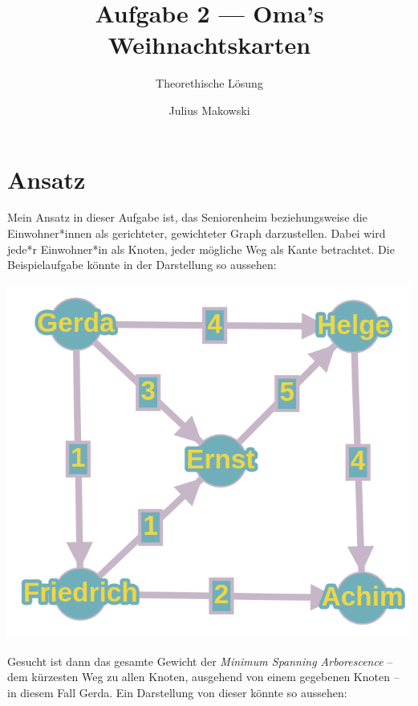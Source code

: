 \documentclass[12pt]{scrartcl}
\title{Aufgabe 2 --- Oma's Weihnachtskarten}
\subtitle{Theorethische L\"osung}
\author{Julius Makowski}
\date{}
\begin{document}
  \maketitle

  \section{Ansatz}
    Mein Ansatz in dieser Aufgabe ist, das Seniorenheim beziehungsweise die Einwohner*innen als gerichteter, gewichteter Graph darzustellen. Dabei wird jede*r Einwohner*in als Knoten, jeder m{\"o}gliche Weg als Kante betrachtet. Die Beispielaufgabe k{\"o}nnte in der Darstellung so aussehen:

    \vspace{12pt}
    \begin{center}
      \includegraphics[scale=0.2]{graph}
    \end{center}

    \vspace{12pt}\noindent
    Gesucht ist dann das gesamte Gewicht der \textit{Minimum Spanning Arborescence} -- dem k{\"u}rzesten Weg zu allen Knoten, ausgehend von einem gegebenen Knoten -- in diesem Fall Gerda. Ein Darstellung von dieser k{\"o}nnte so aussehen:
\end{document}
